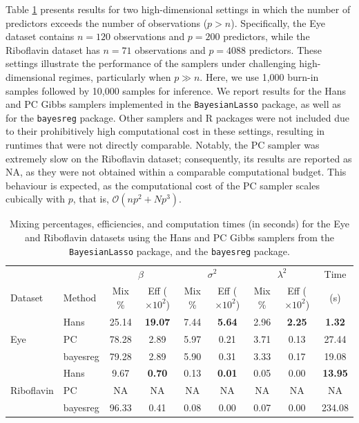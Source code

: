 Table \ref{tab:eye_riboflavin_results} presents results for two high-dimensional settings in which the number of predictors exceeds the number of observations ($p > n$). Specifically, the Eye dataset contains $n = 120$ observations and $p = 200$ predictors, while the Riboflavin dataset has $n = 71$ observations and $p = 4088$ predictors. These settings illustrate the performance of the samplers under challenging high-dimensional regimes, particularly when $p \gg n$. Here, we use 1,000 burn-in samples followed by 10,000 samples for inference. We report results for the Hans and PC Gibbs samplers implemented in the \texttt{BayesianLasso} package, as well as for the \texttt{bayesreg} package. Other samplers and R packages were not included due to their prohibitively high computational cost in these settings, resulting in runtimes that were not directly comparable. Notably, the PC sampler was extremely slow on the Riboflavin dataset; consequently, its results are reported as NA, as they were not obtained within a comparable computational budget. This behaviour is expected, as the computational cost of the PC sampler scales cubically with $p$, that is, $\mathcal{O}(np^2 + Np^3)$.



\begin{table}[ht]
\centering
\small
\setlength{\tabcolsep}{6pt}
\begin{tabular}{l l cc cc cc c}
\toprule
& & \multicolumn{2}{c}{$\beta$} 
& \multicolumn{2}{c}{$\sigma^2$} 
& \multicolumn{2}{c}{$\lambda^2$} 
& Time \\

Dataset & Method 
& Mix \% & Eff
($\times 10^2$) 
& Mix \% & Eff  
($\times 10^2$) 
& Mix \% & Eff ($\times 10^2$) 
& (s) \\

\midrule
\multirow{3}{*}{Eye}
& Hans     &  25.14  &  \textbf{19.07}  &  7.44  & \textbf{5.64}  &  2.96  &  \textbf{2.25}  &  \textbf{1.32}  \\
& PC       &  78.28  &  2.89  &   5.97  &  0.21  &  3.71  &  0.13  &  27.44  \\
& bayesreg &  79.28  &  2.89 &  5.90  &  0.31 &   3.33  &  0.17  &  19.08  \\

\midrule
\multirow{3}{*}{Riboflavin}
& Hans     &  9.67  &  \textbf{0.70}  &  0.13  &  \textbf{0.01}  & 0.05 &  0.00  &  \textbf{13.95}  \\
& PC       &  NA  &  NA  &  NA  &  NA  &  NA  &  NA  & NA  \\
& bayesreg &   96.33  &  0.41  &  0.08 &  0.00  &  0.07  &  0.00  &  234.08 \\

\bottomrule
\end{tabular}
\caption{Mixing percentages, efficiencies, and computation times (in seconds) for the Eye and Riboflavin datasets using the Hans and PC Gibbs samplers from the \texttt{BayesianLasso} package, and the \texttt{bayesreg} package.}
\label{tab:eye_riboflavin_results}
\end{table}

